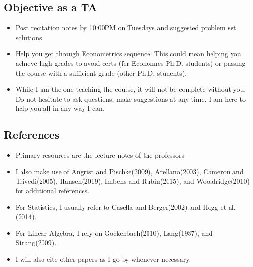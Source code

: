 \documentclass[12pt]{article}
\theoremstyle{definition}
\theoremstyle{property}
\theoremstyle{example}
\begin{document}
\subsection{Objective as a TA}
\begin{itemize}
\item Post recitation notes by 10:00PM on Tuesdays and suggested problem set solutions
\item Help you get through Econometrics sequence. This could mean helping you achieve high grades to avoid certs (for Economics Ph.D. students) or  passing the course with a sufficient grade (other Ph.D. students).  
\item While I am the one teaching the course, it will not be complete without you. Do not hesitate to ask questions, make suggestions at any time. I am here to help you all in any way I can. 
\end{itemize}
\subsection{References}
\begin{itemize}
\item Primary resources are the lecture notes of the professors
\item I also make use of Angrist and Pischke(2009), Arellano(2003), Cameron and Trivedi(2005), Hansen(2019),  Imbens and Rubin(2015), and Wooldridge(2010) for additional references.
\item For Statistics, I usually refer to Casella and Berger(2002) and Hogg et al.(2014).
\item For Linear Algebra, I rely on Gockenbach(2010), Lang(1987), and Strang(2009).
\item I will also cite other papers as I go by whenever necessary. 
\end{itemize}
\end{document}
